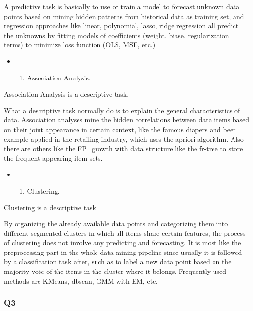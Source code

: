 \documentclass[11pt]{article}
\providecommand{\tightlist}{%
      \setlength{\itemsep}{0pt}\setlength{\parskip}{0pt}}
\begin{document}
A predictive task is basically to use or train a model to forecast
unknown data points based on mining hidden patterns from historical data
as training set, and regression approaches like linear, polynomial,
lasso, ridge regression all predict the unknowns by fitting models of
coefficients (weight, biase, regularization terms) to minimize loss
function (OLS, MSE, etc.).

    \begin{itemize}
\item
  \begin{enumerate}
  \def\labelenumi{\alph{enumi})}
  \setcounter{enumi}{1}
  \tightlist
  \item
    Association Analysis.
  \end{enumerate}
\end{itemize}

Association Analysis is a descriptive task.

What a descriptive task normally do is to explain the general
characteristics of data. Association analyses mine the hidden
correlations between data items based on their joint appearance in
certain context, like the famous diapers and beer example applied in the
retailing industry, which uses the apriori algorithm. Also there are
others like the FP\_growth with data structure like the fr-tree to store
the frequent appearing item sets.

    \begin{itemize}
\item
  \begin{enumerate}
  \def\labelenumi{\alph{enumi})}
  \setcounter{enumi}{2}
  \tightlist
  \item
    Clustering.
  \end{enumerate}
\end{itemize}

Clustering is a descriptive task.

By organizing the already available data points and categorizing them
into different segmented clusters in which all items share certain
features, the process of clustering does not involve any predicting and
forecasting. It is most like the preprocessing part in the whole data
mining pipeline since usually it is followed by a classification task
after, such as to label a new data point based on the majority vote of
the items in the cluster where it belongs. Frequently used methods are
KMeans, dbscan, GMM with EM, etc.

    \subsubsection{Q3}\label{q3}
\end{document}
